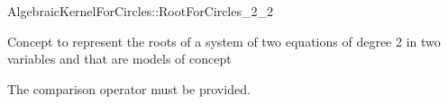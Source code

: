 \begin{ccRefConcept}{AlgebraicKernelForCircles::RootForCircles_2_2}

\ccDefinition

Concept to represent the roots of a system of two equations of degree 2
in two variables  and  that are models of concept



\ccOperations

The comparison operator \ccc{==} must be provided. 


\ccHasModels


\ccSeeAlso


\end{ccRefConcept}

